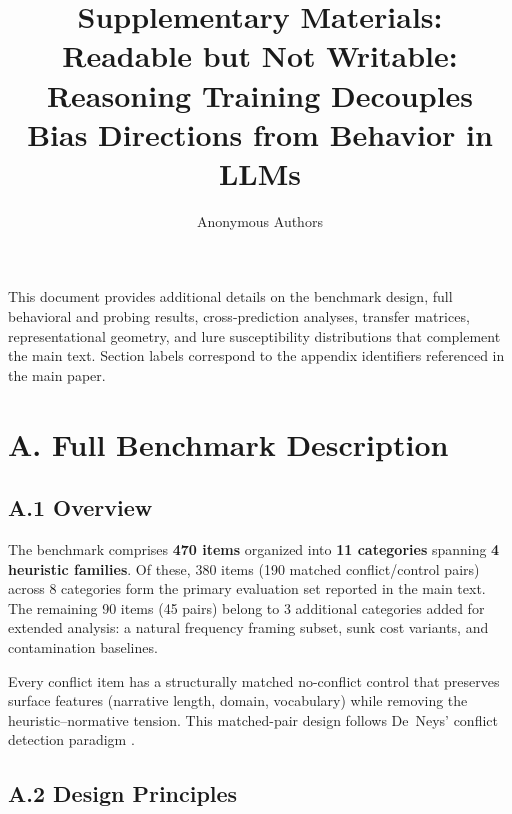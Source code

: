 \documentclass{article}
\title{Supplementary Materials:\\
  Readable but Not Writable: Reasoning Training Decouples\\
  Bias Directions from Behavior in LLMs}
\author{Anonymous Authors}
\date{}
\begin{document}
\maketitle

\noindent This document provides additional details on the benchmark
design, full behavioral and probing results, cross-prediction analyses,
transfer matrices, representational geometry, and lure susceptibility
distributions that complement the main text.  Section labels correspond
to the appendix identifiers referenced in the main paper.


\section*{A. Full Benchmark Description}
\label{sec:appendix_benchmark}

\subsection*{A.1 Overview}

The benchmark comprises \textbf{470 items} organized into \textbf{11
categories} spanning \textbf{4 heuristic families}.  Of these, 380
items (190 matched conflict/control pairs) across 8 categories form the
primary evaluation set reported in the main text.  The remaining 90
items (45 pairs) belong to 3 additional categories added for extended
analysis: a natural frequency framing subset, sunk cost variants, and
contamination baselines.

Every conflict item has a structurally matched no-conflict control that
preserves surface features (narrative length, domain, vocabulary) while
removing the heuristic--normative tension.  This matched-pair design
follows De~Neys' conflict detection paradigm \citep{deneys2012bias}.

\subsection*{A.2 Design Principles}
\end{document}
